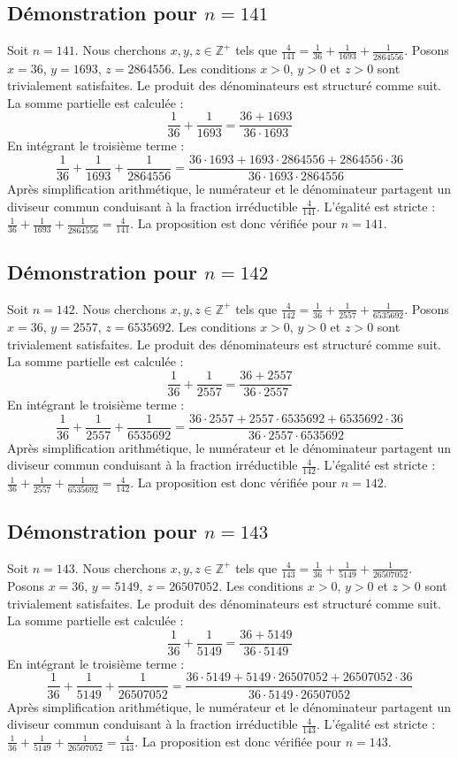 \documentclass[11pt,a4paper]{article}
\begin{document}
\subsection{Démonstration pour $n = 141$}
Soit $n = 141$. Nous cherchons $x, y, z \in \mathbb{Z}^{+}$ tels que $\frac{4}{141} = \frac{1}{36} + \frac{1}{1693} + \frac{1}{2864556}$.
Posons $x = 36$, $y = 1693$, $z = 2864556$.
Les conditions $x > 0$, $y > 0$ et $z > 0$ sont trivialement satisfaites.
Le produit des dénominateurs est structuré comme suit. La somme partielle est calculée :
$$ \frac{1}{36} + \frac{1}{1693} = \frac{36+1693}{36 \cdot 1693} $$
En intégrant le troisième terme :
$$ \frac{1}{36} + \frac{1}{1693} + \frac{1}{2864556} = \frac{36 \cdot 1693 + 1693 \cdot 2864556 + 2864556 \cdot 36}{36 \cdot 1693 \cdot 2864556} $$
Après simplification arithmétique, le numérateur et le dénominateur partagent un diviseur commun conduisant à la fraction irréductible $\frac{4}{141}$.
L'égalité est stricte : $\frac{1}{36} + \frac{1}{1693} + \frac{1}{2864556} = \frac{4}{141}$.
La proposition est donc vérifiée pour $n = 141$.
\subsection{Démonstration pour $n = 142$}
Soit $n = 142$. Nous cherchons $x, y, z \in \mathbb{Z}^{+}$ tels que $\frac{4}{142} = \frac{1}{36} + \frac{1}{2557} + \frac{1}{6535692}$.
Posons $x = 36$, $y = 2557$, $z = 6535692$.
Les conditions $x > 0$, $y > 0$ et $z > 0$ sont trivialement satisfaites.
Le produit des dénominateurs est structuré comme suit. La somme partielle est calculée :
$$ \frac{1}{36} + \frac{1}{2557} = \frac{36+2557}{36 \cdot 2557} $$
En intégrant le troisième terme :
$$ \frac{1}{36} + \frac{1}{2557} + \frac{1}{6535692} = \frac{36 \cdot 2557 + 2557 \cdot 6535692 + 6535692 \cdot 36}{36 \cdot 2557 \cdot 6535692} $$
Après simplification arithmétique, le numérateur et le dénominateur partagent un diviseur commun conduisant à la fraction irréductible $\frac{4}{142}$.
L'égalité est stricte : $\frac{1}{36} + \frac{1}{2557} + \frac{1}{6535692} = \frac{4}{142}$.
La proposition est donc vérifiée pour $n = 142$.
\subsection{Démonstration pour $n = 143$}
Soit $n = 143$. Nous cherchons $x, y, z \in \mathbb{Z}^{+}$ tels que $\frac{4}{143} = \frac{1}{36} + \frac{1}{5149} + \frac{1}{26507052}$.
Posons $x = 36$, $y = 5149$, $z = 26507052$.
Les conditions $x > 0$, $y > 0$ et $z > 0$ sont trivialement satisfaites.
Le produit des dénominateurs est structuré comme suit. La somme partielle est calculée :
$$ \frac{1}{36} + \frac{1}{5149} = \frac{36+5149}{36 \cdot 5149} $$
En intégrant le troisième terme :
$$ \frac{1}{36} + \frac{1}{5149} + \frac{1}{26507052} = \frac{36 \cdot 5149 + 5149 \cdot 26507052 + 26507052 \cdot 36}{36 \cdot 5149 \cdot 26507052} $$
Après simplification arithmétique, le numérateur et le dénominateur partagent un diviseur commun conduisant à la fraction irréductible $\frac{4}{143}$.
L'égalité est stricte : $\frac{1}{36} + \frac{1}{5149} + \frac{1}{26507052} = \frac{4}{143}$.
La proposition est donc vérifiée pour $n = 143$.
\end{document}
